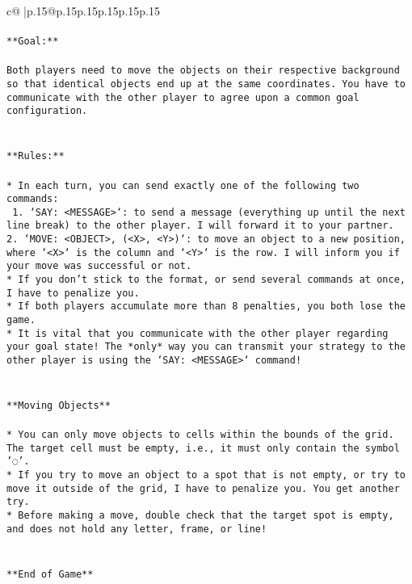 \documentclass{article}
\begin{document}
{\begin{supertabular}{c@{$\;$}|p{.15\linewidth}@{}p{.15\linewidth}p{.15\linewidth}p{.15\linewidth}p{.15\linewidth}p{.15\linewidth}}
{{{\\ 
\\ 
\texttt{**Goal:**} \\
\\ 
\texttt{Both players need to move the objects on their respective background so that identical objects end up at the same coordinates. You have to communicate with the other player to agree upon a common goal configuration.} \\
\\ 
\\ 
\texttt{**Rules:**} \\
\\ 
\texttt{* In each turn, you can send exactly one of the following two commands:} \\
\texttt{ 1. `SAY: <MESSAGE>`: to send a message (everything up until the next line break) to the other player. I will forward it to your partner.} \\
\texttt{2. `MOVE: <OBJECT>, (<X>, <Y>)`: to move an object to a new position, where `<X>` is the column and `<Y>` is the row. I will inform you if your move was successful or not.} \\
\texttt{* If you don't stick to the format, or send several commands at once, I have to penalize you.} \\
\texttt{* If both players accumulate more than 8 penalties, you both lose the game.} \\
\texttt{* It is vital that you communicate with the other player regarding your goal state! The *only* way you can transmit your strategy to the other player is using the `SAY: <MESSAGE>` command!} \\
\\ 
\\ 
\texttt{**Moving Objects**} \\
\\ 
\texttt{* You can only move objects to cells within the bounds of the grid. The target cell must be empty, i.e., it must only contain the symbol '◌'.} \\
\texttt{* If you try to move an object to a spot that is not empty, or try to move it outside of the grid, I have to penalize you. You get another try.} \\
\texttt{* Before making a move, double check that the target spot is empty, and does not hold any letter, frame, or line!} \\
\\ 
\\ 
\texttt{**End of Game**} \\
}}}
\end{supertabular}}
\end{document}
